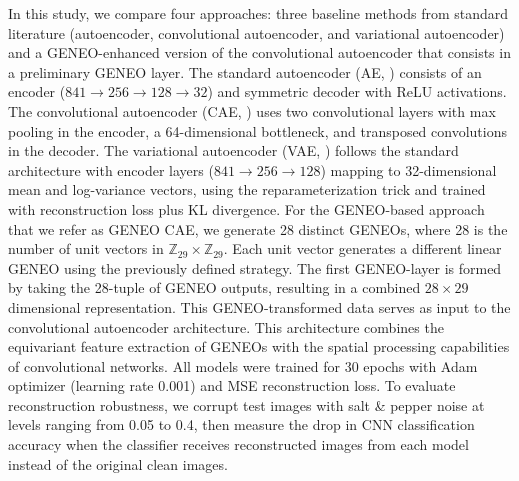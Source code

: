 \documentclass[11pt]{article}
\newcommand{\Z}{\mathbb{Z}}
\newcommand{\pat}[1]{\todo[author=Patrizio]{#1}}
\begin{document}
In this study, we compare four approaches: three baseline methods from standard literature (autoencoder, convolutional autoencoder, and variational autoencoder) and a GENEO-enhanced version of the convolutional autoencoder that consists in a preliminary GENEO layer. The standard autoencoder (AE, \cite{hinton2006reducing}) consists of an encoder ($841\to256\to128\to32$) and symmetric decoder with ReLU activations. The convolutional autoencoder (CAE, \cite{masci2011stacked}) uses two convolutional layers with max pooling in the encoder, a 64-dimensional bottleneck, and transposed convolutions in the decoder. The variational autoencoder (VAE, \cite{kingma2013auto}) follows the standard architecture with encoder layers ($841\to256\to128$) mapping to 32-dimensional mean and log-variance vectors, using the reparameterization trick 
and trained with reconstruction loss plus KL divergence. For the GENEO-based approach that we refer as GENEO CAE, we generate 28 distinct GENEOs, where 28 is the number of unit vectors in $\Z_{29}\times\Z_{29}$. Each unit vector generates a different linear GENEO using the previously defined strategy. The first GENEO-layer is formed by taking the 28-tuple of GENEO outputs, resulting in a combined $28\times29$ dimensional representation. This GENEO-transformed data serves as input to the convolutional autoencoder architecture. This architecture combines the equivariant feature extraction of GENEOs with the spatial processing capabilities of convolutional networks. All models were trained for 30 epochs with Adam optimizer (learning rate 0.001) and MSE reconstruction loss. To evaluate reconstruction robustness, we corrupt test images with salt \& pepper noise at levels ranging from 0.05 to 0.4, then measure the drop in CNN classification accuracy when the classifier receives reconstructed images from each model instead of the original clean images.
\end{document}

